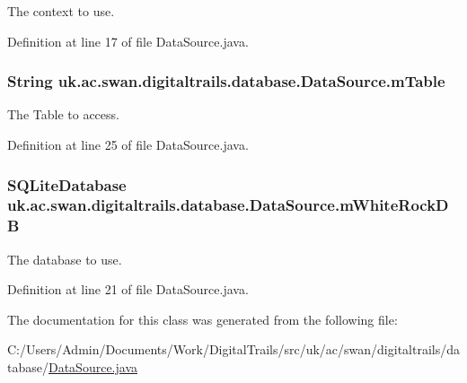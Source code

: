 The context to use. 



Definition at line 17 of file Data\+Source.\+java.

\hypertarget{classuk_1_1ac_1_1swan_1_1digitaltrails_1_1database_1_1_data_source_a5a038e9db6a268c1f8f70d74f0981e93}{
\subsubsection[{m\+Table}]{\setlength{\rightskip}{0pt plus 5cm}String uk.\+ac.\+swan.\+digitaltrails.\+database.\+Data\+Source.\+m\+Table\hspace{0.3cm}{\ttfamily [protected]}}}\label{classuk_1_1ac_1_1swan_1_1digitaltrails_1_1database_1_1_data_source_a5a038e9db6a268c1f8f70d74f0981e93}


The Table to access. 



Definition at line 25 of file Data\+Source.\+java.

\hypertarget{classuk_1_1ac_1_1swan_1_1digitaltrails_1_1database_1_1_data_source_aafb91ad4da9b6ea6520f1268f9a6771d}{
\subsubsection[{m\+White\+Rock\+D\+B}]{\setlength{\rightskip}{0pt plus 5cm}S\+Q\+Lite\+Database uk.\+ac.\+swan.\+digitaltrails.\+database.\+Data\+Source.\+m\+White\+Rock\+D\+B\hspace{0.3cm}{\ttfamily [protected]}}}\label{classuk_1_1ac_1_1swan_1_1digitaltrails_1_1database_1_1_data_source_aafb91ad4da9b6ea6520f1268f9a6771d}


The database to use. 



Definition at line 21 of file Data\+Source.\+java.



The documentation for this class was generated from the following file\+:\begin{DoxyCompactItemize}
\item 
C\+:/\+Users/\+Admin/\+Documents/\+Work/\+Digital\+Trails/src/uk/ac/swan/digitaltrails/database/\hyperlink{_data_source_8java}{Data\+Source.\+java}\end{DoxyCompactItemize}
